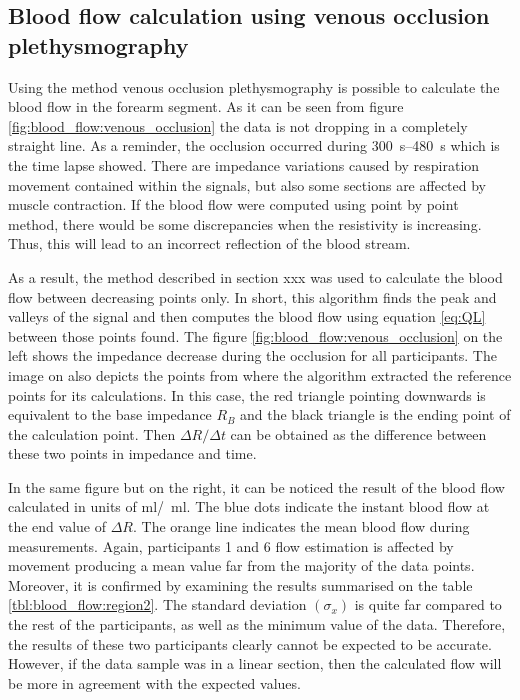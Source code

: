 \subsection{Blood flow calculation using venous occlusion plethysmography}
\label{section5.4.1}
Using the method venous occlusion plethysmography is possible to calculate the blood flow in the forearm segment. As it can be seen from figure \ref{fig:blood_flow:venous_occlusion} the data is not dropping in a completely straight line. As a reminder, the occlusion occurred during \SIrange{300}{480}{\second} which is the time lapse showed. There are impedance variations caused by respiration movement contained within the signals, but also some sections are affected by muscle contraction. If the blood flow were computed using point by point method, there would be some discrepancies when the resistivity is increasing. Thus, this will lead to an incorrect reflection of the blood stream. 

As a result, the method described in section xxx was used to calculate the blood flow between decreasing points only. In short, this algorithm finds the peak and valleys of the signal and then computes the blood flow using equation \ref{eq:QL} between those points found. The figure \ref{fig:blood_flow:venous_occlusion} on the left shows the impedance decrease during the occlusion for all participants. The image on also depicts the points from where the algorithm extracted the reference points for its calculations. In this case, the red triangle pointing downwards is equivalent to the base impedance $R_B$ and the black triangle is the ending point of the calculation point. Then $\Delta R / \Delta t$ can be obtained as the difference between these two points in impedance and time. 

In the same figure but on the right, it can be noticed the result of the blood flow calculated in units of \si{\ml /  \ml}. The blue dots indicate the instant blood flow at the end value of $\Delta R$. The orange line indicates the mean blood flow during measurements. Again, participants 1 and 6 flow estimation is affected by movement producing a mean value far from the majority of the data points. Moreover, it is confirmed by examining the results summarised on the table \ref{tbl:blood_flow:region2}. The standard deviation $(\sigma_x)$ is quite far compared to the rest of the participants, as well as the minimum value of the data. Therefore, the results of these two participants clearly cannot be expected to be accurate. However, if the data sample was in a linear section, then the calculated flow will be more in agreement with the expected values. 

